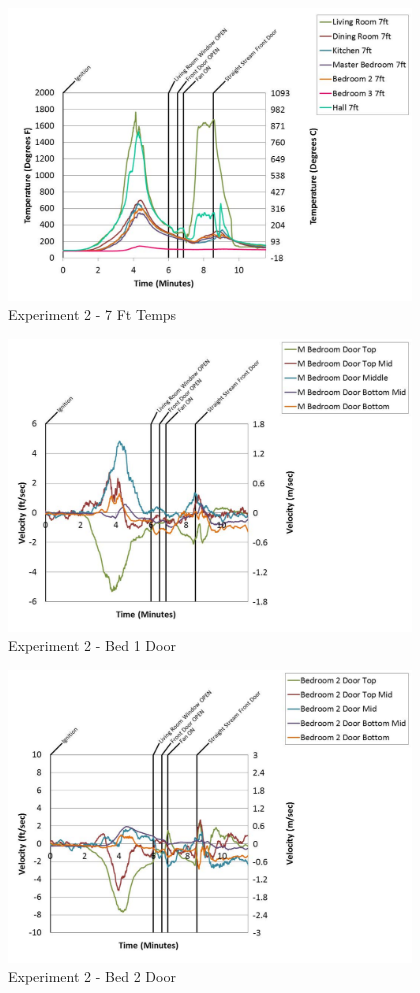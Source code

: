 \documentclass{article}
\begin{document}
\begin{appendices}
	\begin{figure}[h!]
		\centering
		\includegraphics[height=3.05in]{0_Images/Results_Charts/Exp_2_Charts/7FtTemps.pdf}
		\caption{Experiment 2 - 7 Ft Temps}
	\end{figure}
 
	\clearpage

	\begin{figure}[h!]
		\centering
		\includegraphics[height=3.05in]{0_Images/Results_Charts/Exp_2_Charts/Bed1Door.pdf}
		\caption{Experiment 2 - Bed 1 Door}
	\end{figure}
 

	\begin{figure}[h!]
		\centering
		\includegraphics[height=3.05in]{0_Images/Results_Charts/Exp_2_Charts/Bed2Door.pdf}
		\caption{Experiment 2 - Bed 2 Door}
	\end{figure}
 

\end{appendices}
\end{document}
